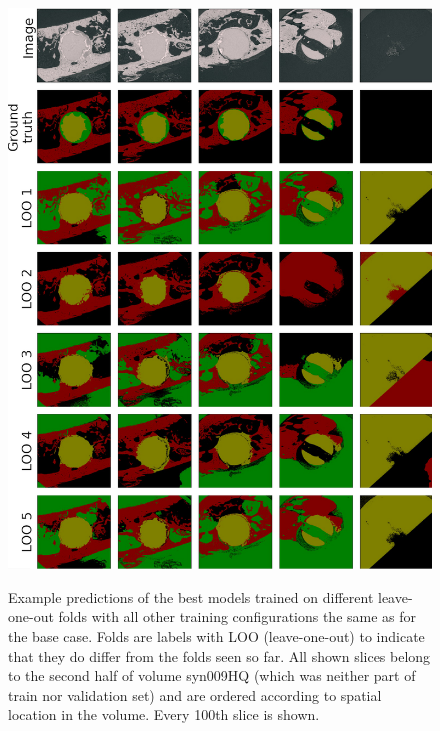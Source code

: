 \begin{figure}[p]
    \centering
    \includegraphics[width=\textwidth]{pictures/experiment_2/for_paper_base-case_LOO_example_predictions_2_all_folds}\\
    \caption[Predictions for Different Leave-one-out Folds]{Example predictions of the best models trained on different leave-one-out folds with all other training configurations the same as for the base case. Folds are labels with LOO (leave-one-out) to indicate that they do differ from the folds seen so far. All shown slices belong to the second half of volume syn009HQ (which was neither part of train nor validation set) and are ordered according to spatial location in the volume. Every 100th slice is shown.}
    \label{fig:example-predictions-folds-loo}
\end{figure}

